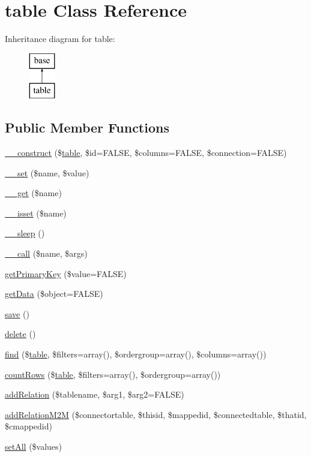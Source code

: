 \hypertarget{classtable}{
\section{table Class Reference}
\label{classtable}
}
Inheritance diagram for table:\begin{figure}[H]
\begin{center}
\leavevmode
\includegraphics[height=2.000000cm]{classtable}
\end{center}
\end{figure}
\subsection*{Public Member Functions}
\begin{DoxyCompactItemize}
\item 
\hyperlink{classtable_adb8d24f1376e0b2c5f31deb281c76385}{\_\-\_\-construct} (\$\hyperlink{classtable}{table}, \$id=FALSE, \$columns=FALSE, \$connection=FALSE)
\item 
\hyperlink{classtable_a83c2703c91959192f759992ad5640b67}{\_\-\_\-set} (\$name, \$value)
\item 
\hyperlink{classtable_abc8e9e31bb15c8a44c3210ec551407c8}{\_\-\_\-get} (\$name)
\item 
\hyperlink{classtable_a8f132f051b7cd7d570ccb9f6e2bb4201}{\_\-\_\-isset} (\$name)
\item 
\hyperlink{classtable_aaf11785905da71774e052912d784e3b4}{\_\-\_\-sleep} ()
\item 
\hyperlink{classtable_af231e86ad32039b9573ae228db5a29fa}{\_\-\_\-call} (\$name, \$args)
\item 
\hyperlink{classtable_ae671e339cdf6b77d4f8a9f6288000502}{getPrimaryKey} (\$value=FALSE)
\item 
\hyperlink{classtable_ac1eeb13dfaefd70b4c778080e5330525}{getData} (\$object=FALSE)
\item 
\hyperlink{classtable_afc8a3c62679cf00ade9f15fb2a6d6132}{save} ()
\item 
\hyperlink{classtable_a13bdffdd926f26b825ea57066334ff01}{delete} ()
\item 
\hyperlink{classtable_a144f2a49e9970315392c13525d5de652}{find} (\$\hyperlink{classtable}{table}, \$filters=array(), \$ordergroup=array(), \$columns=array())
\item 
\hyperlink{classtable_a456b3964c514406cc9498fc49e8c0317}{countRows} (\$\hyperlink{classtable}{table}, \$filters=array(), \$ordergroup=array())
\item 
\hyperlink{classtable_aa86daa58bc1ff877f2137c27b222dff6}{addRelation} (\$tablename, \$arg1, \$arg2=FALSE)
\item 
\hyperlink{classtable_a29c2012e7cc6b182cc3ca63acfc324b9}{addRelationM2M} (\$connectortable, \$thisid, \$mappedid, \$connectedtable, \$thatid, \$cmappedid)
\item 
\hyperlink{classtable_ac228d1f699104433c0f2679dd2dacdaf}{setAll} (\$values)
\end{DoxyCompactItemize}
